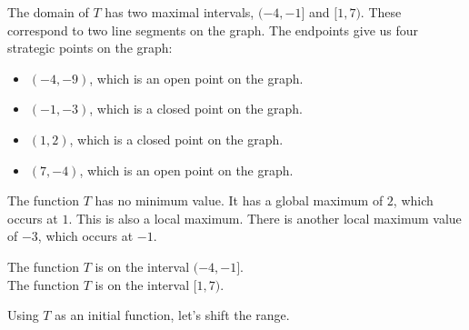 \documentclass{ximera}
\begin{document}
\begin{example}
\begin{image}
\end{image}







The domain of $T$ has two maximal intervals, $(-4,-1]$ and $[1,7)$.  These correspond to two line segments on the graph. The endpoints give us four strategic points on the graph: 

\begin{itemize}

\item $(-4, -9)$, which is an open point on the graph.
\item $(-1, -3)$, which is a closed point on the graph.
\item $(1, 2)$, which is a closed point on the graph.
\item $(7, -4)$, which is an open point on the graph.

\end{itemize}


The function $T$ has no minimum value.  It has a global maximum of $2$, which occurs at $1$.  This is also a local maximum.  There is another local maximum value of $-3$, which occurs at $-1$.

\begin{question}  


The function $T$ is  on the interval $(-4,-1]$. \\
The function $T$ is  on the interval $[1, 7)$.
\end{question}



\end{example}








Using $T$ as an initial function, let's shift the range.
\end{document}
